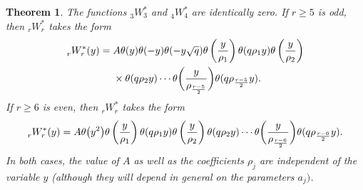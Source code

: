 \documentclass[pdftex]{sigma}
\numberwithin{equation}{section}
\newtheorem{Theorem}{Theorem}[section]
\begin{document}
\begin{Theorem} \label{thm:general_rWr_factorization}
The functions $_3^{}W_3^\ast$ and $_4^{}W_4^\ast$ are identically zero. If $r \geq 5$ is odd, then $_r^{}W_r^\ast$ takes the form
\begin{align}
_r^{}W_r^\ast(y) ={}& A \theta(y) \theta(-y) \theta(-y\sqrt{q}) \theta\left( {y \over \rho_1} \right) \theta(q\rho_1y) \theta\left( {y \over \rho_2} \right)\nonumber\\
&\times \theta(q\rho_2y) \cdots \theta\bigg( {y \over \rho_{r-5 \over 2}} \bigg) \theta(q\rho_{r-5 \over 2}y). \label{eqn:rWr_factorization_odd_case}
\end{align}
If $r \geq 6$ is even, then $_r^{}W_r^\ast$ takes the form
\begin{equation} \label{eqn:rWr_factorization_even_case}
_r^{}W_r^\ast(y) = A \theta\bigl(y^2\bigr) \theta\left( {y \over \rho_1} \right) \theta( q\rho_1y) \theta\left( {y \over \rho_2} \right) \theta(q\rho_2y) \cdots \theta\bigg( {y \over \rho_{r-6 \over 2}} \bigg) \theta( q\rho_{r-6 \over 2}y).
\end{equation}
In both cases, the value of $A$ as well as the coefficients $\rho_j$ are independent of the variable $y$ {\rm(}although they will depend in general on the parameters $a_j)$.
\end{Theorem}
\end{document}

